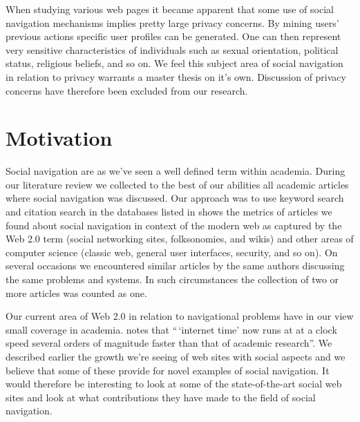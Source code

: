 When studying various web pages it became apparent that some use of
social navigation mechanisms implies pretty large privacy concerns. By mining
users' previous actions specific user profiles can be generated. One can then
represent very sensitive characteristics of individuals such as sexual
orientation, political status, religious beliefs, and so on.
We feel this subject area of social navigation in relation to privacy warrants a
master thesis on it's own. Discussion of privacy concerns have therefore been
excluded from our research.

\section{Motivation}


Social navigation are as we've seen a well defined term within academia.
During our literature review we collected to the best of our abilities all
academic articles where social navigation was discussed. Our approach was to
use keyword search and citation search in the databases listed in
shows the metrics of articles
we found about social navigation in context of the modern web as captured by
the Web 2.0 term (social networking sites, folksonomies, and wikis) and other
areas of computer science (classic web, general user interfaces, security, and
so on).
On several occasions we encountered similar articles by the same authors
discussing the same problems and systems. In such circumstances the collection
of two or more articles was counted as one.

Our current area of Web 2.0 in relation to navigational problems have in our
view small coverage in academia.
\citet{beer07} notes that
 ``\,`internet time' now runs at at a clock speed several orders
 of magnitude faster than that of academic research''.
We described earlier the growth we're seeing of web sites with social
aspects and we believe that some of these provide for novel examples of social
navigation. It would therefore be interesting to look at some of the
state-of-the-art social web sites and look at what contributions they have
made to the field of social navigation.

